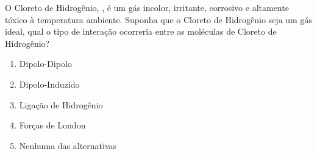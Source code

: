 O Cloreto de Hidrogênio, , é um gás incolor, irritante, corrosivo e altamente tóxico à temperatura ambiente.
Suponha que o Cloreto de Hidrogênio seja um gás ideal, qual o tipo de interação ocorreria entre as moléculas de Cloreto de Hidrogênio?

\begin{enumerate}[label = (\alph*)]
	\item Dipolo-Dipolo
	\item Dipolo-Induzido
	\item Ligação de Hidrogênio
	\item Forças de London
	\item Nenhuma das alternativas
\end{enumerate}

